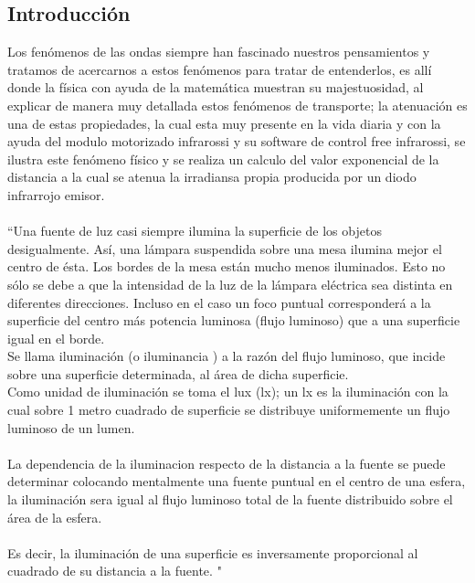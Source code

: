 \documentclass[12]{article}
\begin{document}
\begin{multicols}{2}
\section{Introducción}
Los fenómenos de las ondas siempre han fascinado nuestros pensamientos y tratamos de acercarnos a estos fenómenos para tratar de entenderlos, es allí donde la física con ayuda de la matemática muestran su majestuosidad, al explicar de manera muy detallada estos fenómenos de transporte; la atenuación es una de estas propiedades, la cual esta muy presente en la vida diaria y con la ayuda del modulo motorizado infrarossi y su software de control free infrarossi, se ilustra este fenómeno físico y se realiza un calculo del valor exponencial de la distancia a la cual se atenua la irradiansa propia producida por un diodo infrarrojo emisor. \\ \\
``Una fuente de luz casi siempre ilumina la superficie de los objetos desigualmente. Así, una lámpara suspendida sobre una mesa ilumina mejor el centro de ésta. Los bordes de la mesa están mucho menos iluminados. Esto no sólo se debe a que la intensidad de la luz de la lámpara eléctrica sea distinta en diferentes direcciones. Incluso en el caso un foco puntual corresponderá a la superficie del centro más potencia luminosa (flujo luminoso)  que a una superficie igual en el borde. \\
Se llama iluminación (o iluminancia ) a la razón del flujo luminoso, que incide sobre una superficie determinada, al área de dicha superficie. \\ 
Como unidad de iluminación se toma el lux (lx); un lx es la iluminación con la cual sobre 1 metro cuadrado de superficie se distribuye uniformemente un flujo luminoso de un lumen. \\ \\
La dependencia de la iluminacion respecto de la distancia a la fuente se puede determinar colocando mentalmente una fuente puntual en el centro de una esfera, la iluminación sera igual al flujo luminoso total de la fuente distribuido sobre el área de la esfera. \\ \\
Es decir, la iluminación de una superficie es inversamente proporcional al cuadrado de su distancia a la fuente. "\cite{FISICA4}

\end{multicols}
\end{document}
